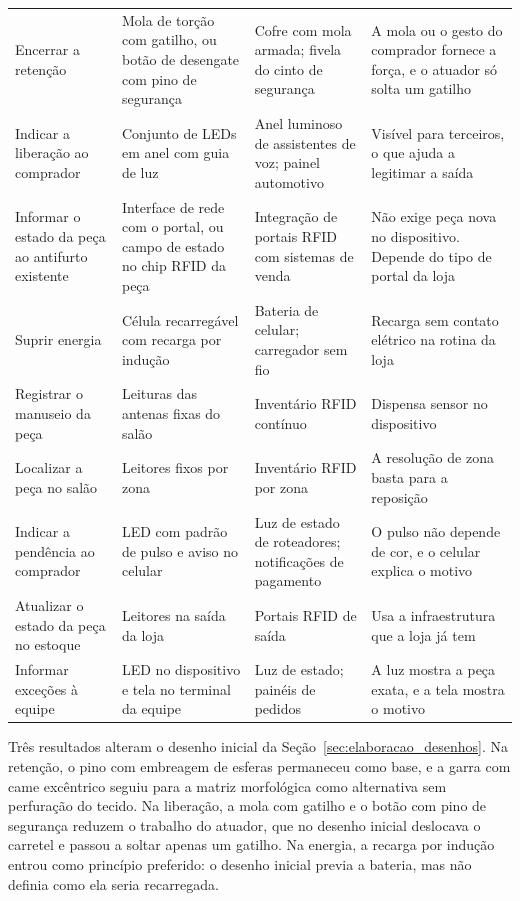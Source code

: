 \begin{table}[p]
\begin{tabularx}{\textwidth}{@{}
        >{\RaggedRight\arraybackslash}p{2.9cm}
        >{\RaggedRight\arraybackslash}p{3.6cm}
        >{\RaggedRight\arraybackslash}p{3.2cm}
        >{\RaggedRight\arraybackslash}X@{}}
        Encerrar a retenção & Mola de torção com gatilho, ou botão de desengate com pino de segurança & Cofre com mola armada; fivela do cinto de segurança & A mola ou o gesto do comprador fornece a força, e o atuador só solta um gatilho \\
        Indicar a liberação ao comprador & Conjunto de LEDs em anel com guia de luz & Anel luminoso de assistentes de voz; painel automotivo & Visível para terceiros, o que ajuda a legitimar a saída \\
        Informar o estado da peça ao antifurto existente & Interface de rede com o portal, ou campo de estado no chip RFID da peça & Integração de portais RFID com sistemas de venda & Não exige peça nova no dispositivo. Depende do tipo de portal da loja \\
        Suprir energia & Célula recarregável com recarga por indução & Bateria de celular; carregador sem fio & Recarga sem contato elétrico na rotina da loja \\
        \midrule
        Registrar o manuseio da peça & Leituras das antenas fixas do salão & Inventário RFID contínuo & Dispensa sensor no dispositivo \\
        Localizar a peça no salão & Leitores fixos por zona & Inventário RFID por zona & A resolução de zona basta para a reposição \\
        Indicar a pendência ao comprador & LED com padrão de pulso e aviso no celular & Luz de estado de roteadores; notificações de pagamento & O pulso não depende de cor, e o celular explica o motivo \\
        Atualizar o estado da peça no estoque & Leitores na saída da loja & Portais RFID de saída & Usa a infraestrutura que a loja já tem \\
        Informar exceções à equipe & LED no dispositivo e tela no terminal da equipe & Luz de estado; painéis de pedidos & A luz mostra a peça exata, e a tela mostra o motivo \\
        \bottomrule
    \end{tabularx}
\end{table}

Três resultados alteram o desenho inicial da Seção~\ref{sec:elaboracao_desenhos}. Na retenção, o pino com embreagem de esferas permaneceu como base, e a garra com came excêntrico seguiu para a matriz morfológica como alternativa sem perfuração do tecido. Na liberação, a mola com gatilho e o botão com pino de segurança reduzem o trabalho do atuador, que no desenho inicial deslocava o carretel e passou a soltar apenas um gatilho. Na energia, a recarga por indução entrou como princípio preferido: o desenho inicial previa a bateria, mas não definia como ela seria recarregada.

